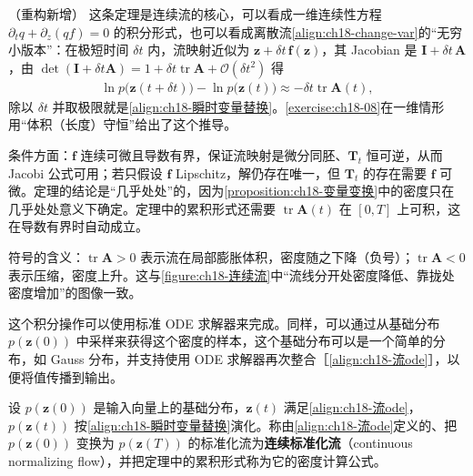 \documentclass[../../main.tex]{subfiles}
\begin{document}
\begin{remark}（重构新增）
这条定理是连续流的核心，可以看成一维连续性方程 $\partial_t q+\partial_z(qf)=0$ 的积分形式，也可以看成离散流\eqref{align:ch18-change-var}的“无穷小版本”：在极短时间 $\delta t$ 内，流映射近似为 $\bm{z}+\delta t\,\bm{f}(\bm{z})$，其 Jacobian 是 $\bm{I}+\delta t\,\bm{A}$，由 $\det(\bm{I}+\delta t\bm{A})=1+\delta t\operatorname{tr}\bm{A}+\mathcal{O}(\delta t^{2})$ 得
\begin{align*}
  \ln p\big(\bm{z}(t+\delta t)\big)-\ln p\big(\bm{z}(t)\big)\approx-\delta t\operatorname{tr}\bm{A}(t),
\end{align*}
除以 $\delta t$ 并取极限就是\eqref{align:ch18-瞬时变量替换}。\cref{exercise:ch18-08}在一维情形用“体积（长度）守恒”给出了这个推导。

条件方面：$\bm{f}$ 连续可微且导数有界，保证流映射是微分同胚、$\bm{T}_t$ 恒可逆，从而 Jacobi 公式可用；若只假设 $\bm{f}$ Lipschitz，解仍存在唯一，但 $\bm{T}_t$ 的存在需要 $\bm{f}$ 可微。定理的结论是“几乎处处”的，因为\cref{proposition:ch18-变量变换}中的密度只在几乎处处意义下确定。定理中的累积形式还需要 $\operatorname{tr}\bm{A}(t)$ 在 $[0,T]$ 上可积，这在导数有界时自动成立。

符号的含义：$\operatorname{tr}\bm{A}>0$ 表示流在局部膨胀体积，密度随之下降（负号）；$\operatorname{tr}\bm{A}<0$ 表示压缩，密度上升。这与\cref{figure:ch18-连续流}中“流线分开处密度降低、靠拢处密度增加”的图像一致。
\end{remark}

这个积分操作可以使用标准 ODE 求解器来完成。同样，可以通过从基础分布 $p(\bm{z}(0))$ 中采样来获得这个密度的样本，这个基础分布可以是一个简单的分布，如 Gauss 分布，并支持使用 ODE 求解器再次整合［\eqref{align:ch18-流ode}］，以便将值传播到输出。

\begin{definition}[连续标准化流]\label{definition:ch18-连续标准化流}
设 $p(\bm{z}(0))$ 是输入向量上的基础分布，$\bm{z}(t)$ 满足\eqref{align:ch18-流ode}，$p(\bm{z}(t))$ 按\eqref{align:ch18-瞬时变量替换}演化。称由\eqref{align:ch18-流ode}定义的、把 $p(\bm{z}(0))$ 变换为 $p(\bm{z}(T))$ 的标准化流为\textbf{连续标准化流}（continuous normalizing flow），并把定理中的累积形式称为它的密度计算公式。
\end{definition}
\end{document}
